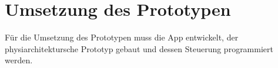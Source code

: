 \section{Umsetzung des Prototypen}
Für die Umsetzung des Prototypen muss die App entwickelt, der physiarchitektursche Prototyp gebaut und dessen Steuerung programmiert werden.



\clearpage


\clearpage


\clearpage
